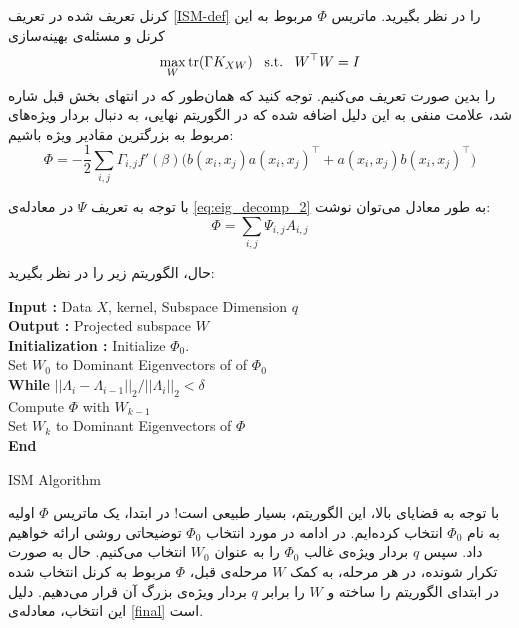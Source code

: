 \begin{den}
کرنل 
تعریف شده در تعریف
\eqref{ISM-def}
را در نظر بگیرید. ماتریس 
$\Phi$
مربوط به این کرنل و مسئله‌ی بهینه‌سازی
\begin{equation}
\max_W \mathrm{tr}(\Gamma K_{XW})\;\;\;\mathrm{s.t.}\;\;\;W^\top W=I
\end{equation}
را بدین صورت تعریف می‌کنیم. توجه کنید که همان‌طور که در انتهای بخش قبل شاره شد، علامت منفی به این دلیل اضافه شده که در الگوریتم نهایی، به دنبال بردار ویژه‌ها‌ی مربوط به بزرگترین مقادیر ويژه باشیم:
\begin{equation}
\Phi = -\frac{1}{2}\sum_{i, j} \Gamma_{i, j} f'(\beta) \Big(b(x_i, x_j)a(x_i, x_j)^\top + a(x_i, x_j)b(x_i, x_j)^\top\Big)
\end{equation}

با توجه به تعریف 
$\Psi$
در معادله‌ی
\eqref{eq:eig_decomp_2}
به طور معادل می‌توان نوشت:
\begin{equation}
\Phi = \sum_{i, j} \Psi_{i, j}A_{i,j}
\end{equation}
\end{den}


حال، الگوریتم زیر را در نظر بگیرید:

\begin{latin}
    \begin{algorithm}[H]
    			\footnotesize
    		\textbf{Input :} Data $X$, kernel, Subspace Dimension $q$\\ \textbf{Output :} Projected subspace $W$ \\
    		\textbf{Initialization :} Initialize $\Phi_0$.\\ 
    		Set $W_0$ to Dominant Eigenvectors of  of $\Phi_0$\\
    		\textbf{While} $||\Lambda_i - \Lambda_{i-1}||_2/||\Lambda_i||_2 < \delta$ \\
    			Compute $\Phi$ with $W_{k-1}$\\
    			Set $W_k$ to Dominant Eigenvectors of $\Phi$\\
    		\textbf{End}

	\caption{ISM Algorithm}
	\label{alg:ism}
\end{algorithm}   
\end{latin}

با توجه به قضایای بالا، این الگوریتم، بسیار طبیعی است! در ابتدا، یک ماتریس 
$\Phi$
اولیه به نام 
$\Phi_0$
انتخاب کرده‌ایم. در ادامه در مورد انتخاب 
$\Phi_0$
توضیحاتی روشی ارائه خواهیم داد. سپس $q$
بردار ویژه‌ی غالب 
$\Phi_0$
را به عنوان 
$W_0$
انتخاب می‌کنیم. حال به صورت تکرار شونده، در هر مرحله، به کمک 
$W$
مرحله‌ی قبل، 
$\Phi$
مربوط به کرنل انتخاب شده در ابتدای الگوریتم را ساخته و 
$W$
را برابر 
$q$
بردار ویژه‌ی بزرگ آن قرار می‌دهیم. دلیل این انتخاب، معادله‌ی
\eqref{final}
است.


